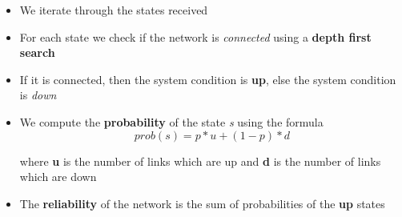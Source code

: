 \documentclass[12pt,letterpaper,titlepage,en-US]{article}
\begin{document}
\begin{itemize}


\item We iterate through the states received

 \item For each state we check if the network is \textit{connected} using a \textbf{depth first search}
 
 \item  If it is connected, then the system condition is \textbf{up}, else the system condition is \textit{down}

\item We compute the \textbf{probability} of the state \textit{s} using the formula
\begin{equation}
prob(s)=p*u + (1-p)*d
\end{equation}

where \textbf{u} is the number of links which are up and \textbf{d} is the number of links which are down

\item The \textbf{reliability} of the network is the sum of probabilities of the \textbf{up} states
 
\end{itemize}
\end{document}
